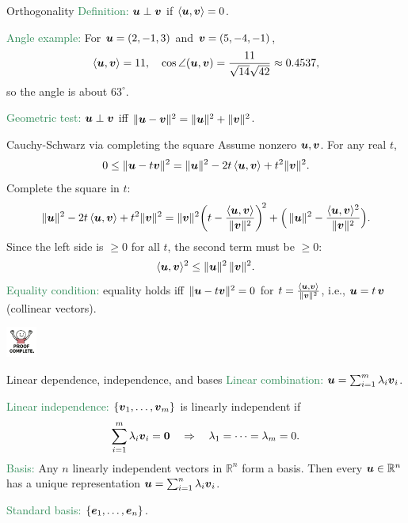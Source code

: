 \documentclass[11pt,aspectratio=169]{beamer}
\begin{document}
\begin{frame}{Orthogonality}
\textcolor{SeaGreen}{Definition:} $\boldsymbol u\perp \boldsymbol v$ if $\langle \boldsymbol u,\boldsymbol v\rangle=0$.
\bigskip

\textcolor{SeaGreen}{Angle example:} For $\boldsymbol u=(2,-1,3)$ and $\boldsymbol v=(5,-4,-1)$,
\[
\langle \boldsymbol u,\boldsymbol v\rangle=11,\quad
\cos\angle(\boldsymbol u,\boldsymbol v)=\frac{11}{\sqrt{14}\sqrt{42}}\approx 0.4537,
\]
so the angle is about $63^\circ$.
\bigskip

\textcolor{SeaGreen}{Geometric test:} $\boldsymbol u\perp \boldsymbol v$ iff $\|\boldsymbol u-\boldsymbol v\|^2=\|\boldsymbol u\|^2+\|\boldsymbol v\|^2$.
\end{frame}

\begin{frame}{Cauchy-Schwarz via completing the square}
Assume nonzero $\boldsymbol u,\boldsymbol v$. For any real $t$,
\[
0\le \|\boldsymbol u-t\boldsymbol v\|^2=\|\boldsymbol u\|^2-2t\,\langle \boldsymbol u,\boldsymbol v\rangle+t^2\|\boldsymbol v\|^2.
\]
Complete the square in $t$:
\[
\|\boldsymbol u\|^2-2t\,\langle \boldsymbol u,\boldsymbol v\rangle+t^2\|\boldsymbol v\|^2
=\|\boldsymbol v\|^2\!\left(t-\frac{\langle \boldsymbol u,\boldsymbol v\rangle}{\|\boldsymbol v\|^2}\right)^{\!2}
+\Big(\,\|\boldsymbol u\|^2-\frac{\langle \boldsymbol u,\boldsymbol v\rangle^2}{\|\boldsymbol v\|^2}\Big).
\]
Since the left side is $\ge 0$ for all $t$, the second term must be $\ge 0$:
\[
\langle \boldsymbol u,\boldsymbol v\rangle^2\le \|\boldsymbol u\|^2\,\|\boldsymbol v\|^2.
\]
\textcolor{SeaGreen}{Equality condition:} equality holds iff $\|\boldsymbol u-t\boldsymbol v\|^2=0$ for $t=\frac{\langle \boldsymbol u,\boldsymbol v\rangle}{\|\boldsymbol v\|^2}$, i.e., $\boldsymbol u=t\,\boldsymbol v$ (collinear vectors).

\hfill\includegraphics[width=1cm]{img/qed.jpg}
\end{frame}



\begin{frame}{Linear dependence, independence, and bases}
\textcolor{SeaGreen}{Linear combination:} $\boldsymbol u=\sum_{i=1}^m \lambda_i \boldsymbol v_i$.
\bigskip

\textcolor{SeaGreen}{Linear independence:} $\{\boldsymbol v_1,\ldots,\boldsymbol v_m\}$ is linearly independent if
\[
\sum_{i=1}^m \lambda_i \boldsymbol v_i=\boldsymbol 0 \quad\Rightarrow\quad \lambda_1=\cdots=\lambda_m=0.
\]
\textcolor{SeaGreen}{Basis:} Any $n$ linearly independent vectors in $\mathbb{R}^n$ form a basis. Then every $\boldsymbol u\in\mathbb{R}^n$ has a \alert{unique} representation $\boldsymbol u=\sum_{i=1}^n \lambda_i \boldsymbol v_i$.
\bigskip

\textcolor{SeaGreen}{Standard basis:} $\{\boldsymbol e_1,\ldots,\boldsymbol e_n\}$.
\end{frame}
\end{document}
